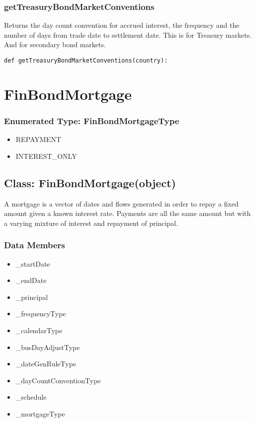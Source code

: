 \documentclass[twoside,11pt]{book}
\begin{document}
\subsubsection*{{\bf getTreasuryBondMarketConventions}}
Returns the day count convention for accrued interest, the frequency and the number of days from trade date to settlement date.  This is for Treasury markets. And for secondary bond markets.  

\begin{lstlisting}
def getTreasuryBondMarketConventions(country):
\end{lstlisting}

\newpage
\section{FinBondMortgage}

\subsubsection{Enumerated Type: FinBondMortgageType}
\begin{itemize}
\item{REPAYMENT}
\item{INTEREST\_ONLY}
\end{itemize}

\subsection*{Class: FinBondMortgage(object)}
A mortgage is a vector of dates and flows generated in order to repay a fixed amount given a known interest rate. Payments are all the same amount but with a varying mixture of interest and repayment of principal.  

\subsubsection*{Data Members}
\begin{itemize}
\item{\_startDate}
\item{\_endDate}
\item{\_principal}
\item{\_frequencyType}
\item{\_calendarType}
\item{\_busDayAdjustType}
\item{\_dateGenRuleType}
\item{\_dayCountConventionType}
\item{\_schedule}
\item{\_mortgageType}
\end{itemize}
\end{document}

